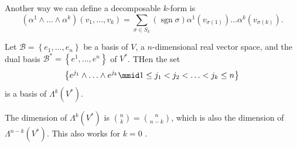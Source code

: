 \documentclass[notoc,notitlepage]{tufte-book}
\DeclareMathOperator{\sgn}{sgn}
\begin{document}
\begin{propo}\label{propo:alternate_definition_of_a_decomposable_k_form}
  Another way we can define a decomposable $k$-form is
  \begin{equation*}
    (\alpha^1 \land \hdots \land \alpha^k)(v_1, \ldots, v_k)
    = \sum_{\sigma \in S_k} (\sgn \sigma) \alpha^1 (v_{\sigma(1)}) \hdots \alpha^k (v_{\sigma(k)}).
  \end{equation*}
\end{propo}

\begin{thm}\label{thm:basis_of_lambda_k_v_}
  Let $\mathcal{B} = \left\{ e_1, \ldots, e_n \right\}$ be a basis of $V$, a $n$-dimensional
  real vector space, and the dual basis $\mathcal{B}^* = \left\{ e^1, \ldots, e^n \right\}$
  of $V^*$. THen the set
  \begin{equation*}
    \left\{ e^{j_1} \land \ldots \land e^{j_k} \mmid 1 \leq j_1 < j_2 < \hdots < j_k \leq n \right\}
  \end{equation*}
  is a basis of $\Lambda^k(V^*)$.
\end{thm}

\begin{crly}\label{crly:dimension_of_lambda_k_v_}
  The dimension of $\Lambda^k(V^*)$ is $\binom{n}{k} = \binom{n}{n - k}$, which is
  also the dimension of $\Lambda^{n - k}(V^*)$. This also works for $k = 0$ .
\end{crly}
\end{document}

